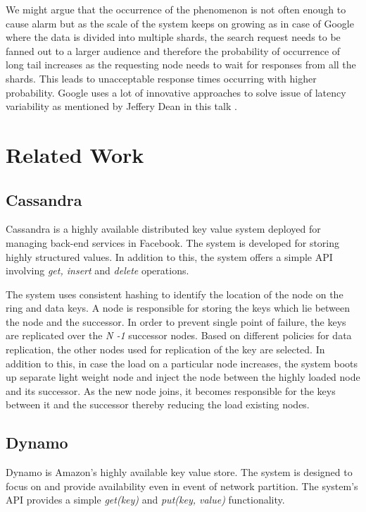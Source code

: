 \documentclass[a4paper,11pt]{kth-mag}
\begin{document}
\par We might argue that the occurrence of the phenomenon is not often enough to cause alarm but as the scale of the system keeps on growing as in case of Google where the data is divided into multiple shards, the search request needs to be fanned out to a larger audience and therefore the probability of occurrence of long tail increases as the requesting node needs to wait for responses from all the shards. This leads to unacceptable response times occurring with higher probability. Google uses a lot of innovative approaches to solve issue of latency variability as mentioned by Jeffery Dean in this talk \cite{jeffDean}. 


\chapter{Related Work}
\label{chap:related_work}



\section{Cassandra}
Cassandra \cite{cassandra} is a highly available distributed key value system deployed for managing back-end services in Facebook. The system is developed for storing highly structured values. In addition to this, the system offers a simple API involving \textit{get, insert} and \textit{delete} operations.
\par The system uses consistent hashing to identify the location of the node on the ring and data keys. A node is responsible for storing the keys which lie between the node and the successor. In order to prevent single point of failure, the keys are replicated over the \textit{N -1} successor nodes. Based on different policies for data replication, the other nodes used for replication of the key are selected. In addition to this, in case the load on a particular node increases, the system boots up separate light weight node and inject the node between the highly loaded node and its successor. As the new node joins, it becomes responsible for the keys between it and the successor thereby reducing the load existing nodes.

\section{Dynamo}
Dynamo \cite{dynamo} is Amazon's highly available key value store. The system is designed to focus on and provide availability even in event of network partition. The system's API provides a simple \textit{get(key)} and \textit{put(key, value)} functionality.
\end{document}
